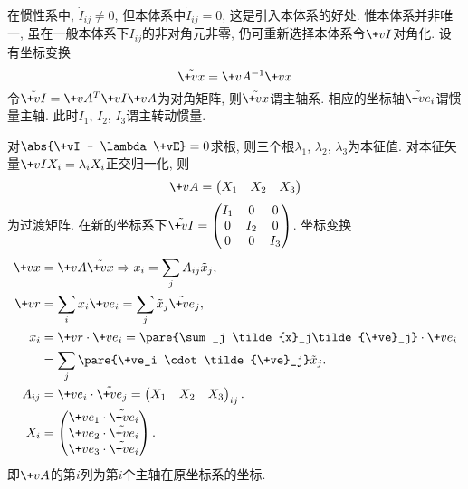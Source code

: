 \documentclass[../LectureNotes.tex]{subfiles}
\begin{document}
在惯性系中, $\dot{I}_{ij} \neq 0$, 但本体系中$\dot{I}_{ij} = 0$, 这是引入本体系的好处. 惟本体系并非唯一, 虽在一般本体系下$I_{ij}$的非对角元非零, 仍可重新选择本体系令$\+vI$对角化. 设有坐标变换
\[ \tilde{\+vx} = \+vA^{-1}\+vx \]
令$\tilde{\+vI} = \+vA^T \+vI \+vA$为对角矩阵, 则$\tilde{\+vx}$谓主轴系. 相应的坐标轴$\tilde{\+ve}_i$谓惯量主轴. 此时$I_1$, $I_2$, $I_3$谓主转动惯量.
\par
对$\abs{\+vI - \lambda\+vE} = 0$求根, 则三个根$\lambda_1$, $\lambda_2$, $\lambda_3$为本征值. 对本征矢量$\+vI X_i = \lambda_i X_i$正交归一化, 则
\[ \+vA = \begin{pmatrix}
    X_1 & X_2 & X_3
\end{pmatrix} \]
为过渡矩阵. 在新的坐标系下$\displaystyle \tilde{\+vI} = \begin{pmatrix}
    I_1 & 0 & 0 \\
    0 & I_2 & 0 \\
    0 & 0 & I_3
\end{pmatrix}$. 坐标变换
\begin{align*}
    \+vx &= \+vA\tilde{\+vx} \Rightarrow x_i = \sum_j A_{ij}\tilde{x}_j, \\
    \+vr &= \sum_i x_i \+ve_i = \sum_j \tilde{x}_j \tilde{\+ve}_j, \\
    x_i &= \+vr\cdot\+ve_i = \pare{\sum_j \tilde{x}_j\tilde{\+ve}_j}\cdot\+ve_i \\
    &= \sum_j \pare{\+ve_i \cdot \tilde{\+ve}_j} \tilde{x}_j. \\
    A_{ij} &= \+ve_i \cdot \tilde{\+ve}_j = \begin{pmatrix}
        X_1 & X_2 & X_3
    \end{pmatrix}_{ij}. \\
    X_i &= \begin{pmatrix}
        \+ve_1 \cdot \tilde{\+ve}_i \\
        \+ve_2 \cdot \tilde{\+ve}_i \\
        \+ve_3 \cdot \tilde{\+ve}_i
    \end{pmatrix}.
\end{align*}
即$\+vA$的第$i$列为第$i$个主轴在原坐标系的坐标.
\end{document}
